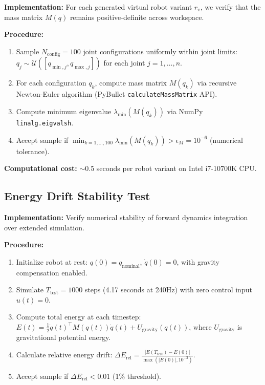 \documentclass[a4paper]{cas-sc}
\begin{document}
\textbf{Implementation:} For each generated virtual robot variant $r_v$, we verify that the mass matrix $M(q)$ remains positive-definite across workspace.

\textbf{Procedure:}
\begin{enumerate}[leftmargin=*, itemsep=1pt]
    \item Sample $N_{\text{config}}=100$ joint configurations uniformly within joint limits: $q_j \sim \mathcal{U}([q_{\min,j}, q_{\max,j}])$ for each joint $j=1,\ldots,n$.
    \item For each configuration $q_k$, compute mass matrix $M(q_k)$ via recursive Newton-Euler algorithm (PyBullet \texttt{calculateMassMatrix} API).
    \item Compute minimum eigenvalue $\lambda_{\min}(M(q_k))$ via NumPy \texttt{linalg.eigvalsh}.
    \item Accept sample if $\min_{k=1,\ldots,100} \lambda_{\min}(M(q_k)) > \epsilon_M = 10^{-6}$ (numerical tolerance).
\end{enumerate}

\textbf{Computational cost:} $\sim$0.5 seconds per robot variant on Intel i7-10700K CPU.

\subsection{Energy Drift Stability Test}

\textbf{Implementation:} Verify numerical stability of forward dynamics integration over extended simulation.

\textbf{Procedure:}
\begin{enumerate}[leftmargin=*, itemsep=1pt]
    \item Initialize robot at rest: $q(0)=q_{\text{nominal}}$, $\dot{q}(0)=0$, with gravity compensation enabled.
    \item Simulate $T_{\text{test}}=1000$ steps (4.17 seconds at 240Hz) with zero control input $u(t)=0$.
    \item Compute total energy at each timestep: $E(t) = \frac{1}{2}\dot{q}(t)^\top M(q(t))\dot{q}(t) + U_{\text{gravity}}(q(t))$, where $U_{\text{gravity}}$ is gravitational potential energy.
    \item Calculate relative energy drift: $\Delta E_{\text{rel}} = \frac{|E(T_{\text{test}}) - E(0)|}{\max(|E(0)|, 10^{-3})}$.
    \item Accept sample if $\Delta E_{\text{rel}} < 0.01$ (1\% threshold).
\end{enumerate}
\end{document}
